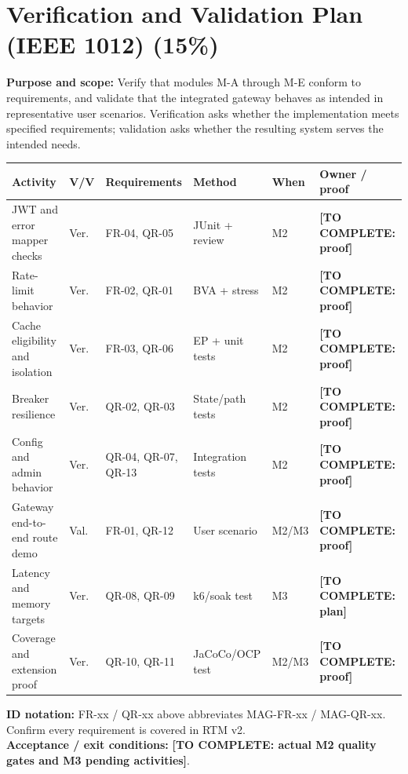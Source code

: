\documentclass[11pt,a4paper]{article}
\newcommand{\todo}[1]{\textcolor{red!70!black}{\textbf{[TO COMPLETE: #1]}}}
\begin{document}
\section{Verification and Validation Plan (IEEE 1012) (15\%)}\label{sec:vv}
\textbf{Purpose and scope:} Verify that modules M-A through M-E conform to requirements, and validate that the integrated gateway behaves as intended in representative user scenarios. Verification asks whether the implementation meets specified requirements; validation asks whether the resulting system serves the intended needs.
\begin{longtable}{L{3.2cm} L{1.0cm} L{2.4cm} L{2.2cm} L{1.3cm} L{2.1cm}}\toprule
\textbf{Activity} & \textbf{V/V} & \textbf{Requirements} & \textbf{Method} & \textbf{When} & \textbf{Owner / proof}\\\midrule\endhead
JWT and error mapper checks & Ver. & FR-04, QR-05 & JUnit + review & M2 & \todo{proof}\\
Rate-limit behavior & Ver. & FR-02, QR-01 & BVA + stress & M2 & \todo{proof}\\
Cache eligibility and isolation & Ver. & FR-03, QR-06 & EP + unit tests & M2 & \todo{proof}\\
Breaker resilience & Ver. & QR-02, QR-03 & State/path tests & M2 & \todo{proof}\\
Config and admin behavior & Ver. & QR-04, QR-07, QR-13 & Integration tests & M2 & \todo{proof}\\
Gateway end-to-end route demo & Val. & FR-01, QR-12 & User scenario & M2/M3 & \todo{proof}\\
Latency and memory targets & Ver. & QR-08, QR-09 & k6/soak test & M3 & \todo{plan}\\
Coverage and extension proof & Ver. & QR-10, QR-11 & JaCoCo/OCP test & M2/M3 & \todo{proof}\\\bottomrule\end{longtable}
\textbf{ID notation:} FR-xx / QR-xx above abbreviates MAG-FR-xx / MAG-QR-xx. Confirm every requirement is covered in RTM v2.\\
\textbf{Acceptance / exit conditions:} \todo{actual M2 quality gates and M3 pending activities}.
\end{document}
